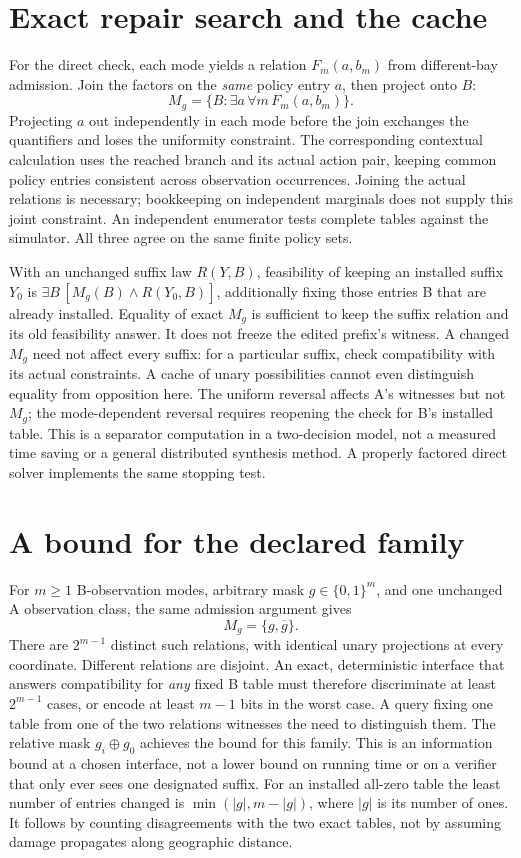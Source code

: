 \documentclass[11pt]{article}
\begin{document}
\section{Exact repair search and the cache}
For the direct check, each mode yields a relation \(F_m(a,b_m)\) from different-bay admission. Join the factors on the \emph{same} policy entry \(a\), then project onto \(B\):
\[
                  M_g=\{B:\exists a\,\forall m\,F_m(a,b_m)\}.
\]
Projecting \(a\) out independently in each mode before the join exchanges the quantifiers and loses the uniformity constraint. The corresponding contextual calculation uses the reached branch and its actual action pair, keeping common policy entries consistent across observation occurrences. Joining the actual relations is necessary; bookkeeping on independent marginals does not supply this joint constraint. An independent enumerator tests complete tables against the simulator. All three agree on the same finite policy sets.

With an unchanged suffix law \(R(Y,B)\), feasibility of keeping an installed suffix \(Y_0\) is \(\exists B\,[M_g(B)\land R(Y_0,B)]\), additionally fixing those entries B that are already installed. Equality of exact \(M_g\) is sufficient to keep the suffix relation and its old feasibility answer. It does not freeze the edited prefix's witness. A changed \(M_g\) need not affect every suffix: for a particular suffix, check compatibility with its actual constraints. A cache of unary possibilities cannot even distinguish equality from opposition here. The uniform reversal affects A's witnesses but not \(M_g\); the mode-dependent reversal requires reopening the check for B's installed table. This is a separator computation in a two-decision model, not a measured time saving or a general distributed synthesis method. A properly factored direct solver implements the same stopping test.

\section{A bound for the declared family}
For \(m\ge1\) B-observation modes, arbitrary mask \(g\in\{0,1\}^m\), and one unchanged A observation class, the same admission argument gives
\[
                           M_g=\{g,\overline{g}\}.
\]
There are \(2^{m-1}\) distinct such relations, with identical unary projections at every coordinate. Different relations are disjoint. An exact, deterministic interface that answers compatibility for \emph{any} fixed B table must therefore discriminate at least \(2^{m-1}\) cases, or encode at least \(m-1\) bits in the worst case. A query fixing one table from one of the two relations witnesses the need to distinguish them. The relative mask \(g_i\oplus g_0\) achieves the bound for this family. This is an information bound at a chosen interface, not a lower bound on running time or on a verifier that only ever sees one designated suffix. For an installed all-zero table the least number of entries changed is \(\min(|g|,m-|g|)\), where \(|g|\) is its number of ones. It follows by counting disagreements with the two exact tables, not by assuming damage propagates along geographic distance.
\end{document}
